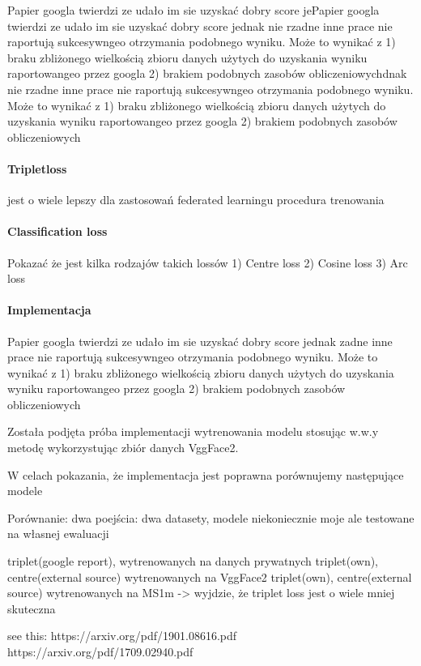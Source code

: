 Papier googla twierdzi ze udało im sie uzyskać dobry score jePapier googla twierdzi ze udało im sie uzyskać dobry score jednak nie rzadne inne prace nie raportują sukcesywngeo otrzymania podobnego wyniku. Może to wynikać z 1) braku zbliżonego wielkością zbioru danych użytych do uzyskania wyniku raportowangeo przez googla  2) brakiem podobnych zasobów obliczeniowychdnak nie rzadne inne prace nie raportują sukcesywngeo otrzymania podobnego wyniku. Może to wynikać z 1) braku zbliżonego wielkością zbioru danych użytych do uzyskania wyniku raportowangeo przez googla  2) brakiem podobnych zasobów obliczeniowych

\paragraph{Tripletloss}
jest o wiele lepszy dla zastosowań federated learningu
procedura trenowania


\paragraph{Classification loss}
Pokazać że jest kilka rodzajów takich lossów
1) Centre loss
2) Cosine loss
3) Arc loss



\paragraph{Implementacja}
Papier googla twierdzi ze udało im sie uzyskać dobry score jednak zadne inne prace nie
raportują sukcesywngeo otrzymania podobnego wyniku. Może to wynikać z 1) braku zbliżonego
wielkością zbioru danych użytych do uzyskania wyniku raportowangeo przez googla 2) brakiem
podobnych zasobów obliczeniowych

Została podjęta próba implementacji wytrenowania modelu stosując w.w.y metodę wykorzystując zbiór danych VggFace2. 

W celach pokazania, że implementacja jest poprawna porównujemy następujące modele

Porównanie:
dwa poejścia: dwa datasety, modele niekoniecznie moje ale testowane na własnej ewaluacji

 triplet(google report), wytrenowanych na danych prywatnych
 triplet(own), centre(external source) wytrenowanych na VggFace2
 triplet(own), centre(external source) wytrenowanych na MS1m
-> wyjdzie, że triplet loss jest o wiele mniej skuteczna 

see this:
https://arxiv.org/pdf/1901.08616.pdf
https://arxiv.org/pdf/1709.02940.pdf



